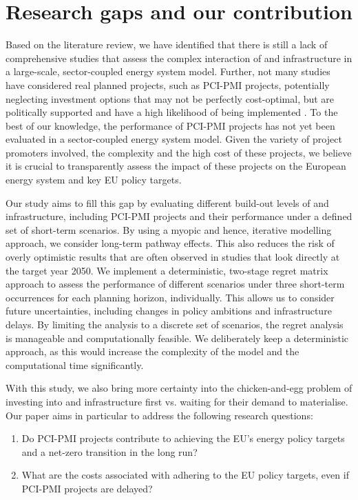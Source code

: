\documentclass[preprint,12pt,sort&compress]{elsarticle}
\begin{document}
\section{Research gaps and our contribution}
Based on the literature review, we have identified that there is still a lack of comprehensive studies that assess the complex interaction of  and  infrastructure in a large-scale, sector-coupled energy system model. Further, not many studies have considered real planned projects, such as PCI-PMI projects, potentially neglecting investment options that may not be perfectly cost-optimal, but are politically supported and have a high likelihood of being implemented \cite{greevenbroekLittleLoseCase2024,trutnevyteDoesCostOptimization2016}. To the best of our knowledge, the performance of PCI-PMI projects has not yet been evaluated in a sector-coupled energy system model. Given the variety of project promoters involved, the complexity and the high cost of these projects, we believe it is crucial to transparently assess the impact of these projects on the European energy system and key EU policy targets.

Our study aims to fill this gap by evaluating different build-out levels of  and  infrastructure, including PCI-PMI projects and their performance under a defined set of short-term scenarios. By using a myopic and hence, iterative modelling approach, we consider long-term pathway effects. This also reduces the risk of overly optimistic results that are often observed in studies that look directly at the target year 2050.
We implement a deterministic, two-stage regret matrix approach to assess the performance of different scenarios under three short-term occurrences for each planning horizon, individually. This allows us to consider future uncertainties, including changes in policy ambitions and infrastructure delays. By limiting the analysis to a discrete set of scenarios, the regret analysis is manageable and computationally feasible. We deliberately keep a deterministic approach, as this would increase the complexity of the model and the computational time significantly.

With this study, we also bring more certainty into the chicken-and-egg problem of investing into  and  infrastructure first vs. waiting for their demand to materialise.
Our paper aims in particular to address the following research questions:
\begin{enumerate} 
  \item Do PCI-PMI projects contribute to achieving the EU's energy policy targets and a net-zero transition in the long run?
  \item What are the costs associated with adhering to the EU policy targets, even if PCI-PMI projects are delayed? 
\end{enumerate}
\end{document}

